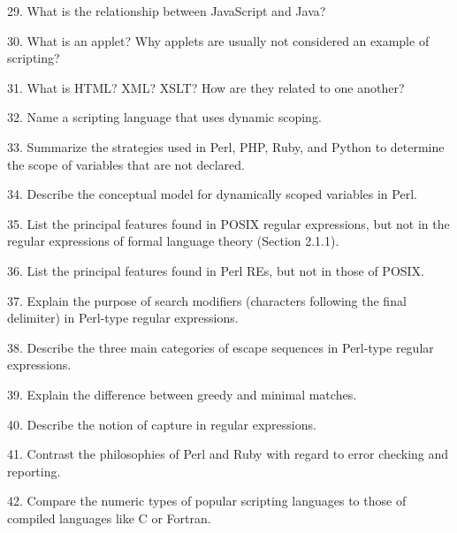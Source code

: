 29. What is the relationship between JavaScript and Java?

\filbreak
\vskip 1cm

30. What is an applet? Why applets are usually not considered an example of scripting?

\filbreak
\vskip 1cm

31. What is HTML? XML? XSLT? How are they related to one another?

\filbreak
\vskip 1cm

32. Name a scripting language that uses dynamic scoping.

\filbreak
\vskip 1cm

33. Summarize the strategies used in Perl, PHP, Ruby, and Python to determine the scope of variables that are not declared.

\filbreak
\vskip 1cm

34. Describe the conceptual model for dynamically scoped variables in Perl.

\filbreak
\vskip 1cm

35. List the principal features found in POSIX regular expressions, but not in the regular expressions of formal language theory (Section 2.1.1).

\filbreak
\vskip 1cm

36. List the principal features found in Perl REs, but not in those of POSIX.

\filbreak
\vskip 1cm

37. Explain the purpose of search modifiers (characters following the final delimiter) in Perl-type regular expressions.

\filbreak
\vskip 1cm

38. Describe the three main categories of escape sequences in Perl-type regular expressions.

\filbreak
\vskip 1cm

39. Explain the difference between greedy and minimal matches.

\filbreak
\vskip 1cm

40. Describe the notion of capture in regular expressions.

\filbreak
\vskip 1cm

41. Contrast the philosophies of Perl and Ruby with regard to error checking and reporting.

\filbreak
\vskip 1cm

42. Compare the numeric types of popular scripting languages to those of compiled languages like C or Fortran.

